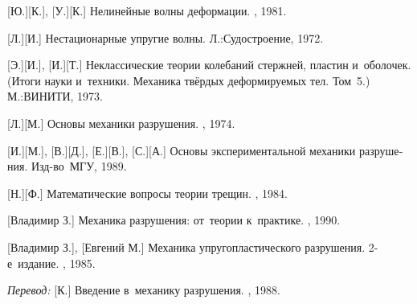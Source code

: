 \begin{thebibliography}{123}
\begin{otherlanguage}{russian}
[Ю.][К.], [У.][К.] Нелинейные волны деформации. \naukapublisher, 1981. 

[Л.][И.] Нестационарные упругие волны. Л.:\;Судостроение, 1972. 

[Э.][И.], [И.][Т.] Неклассические теории колебаний стержней, пластин и~оболочек. (Итоги науки и~техники. Механика твёрдых деформируемых тел. Том~5.) М.:\;ВИНИТИ, 1973. 

%
%



[Л.][М.]
Основы механики разрушения.
\naukapublisher, 1974.

[И.][М.],
[В.][Д.],
[Е.][В.],
[С.][А.]
Основы экспериментальной механики разрушения.
Изд\hbox{-}во~МГУ, 1989.

[Н.][Ф.]
Математические вопросы теории трещин.
\naukapublisher, 1984.

[Владимир З.]
Механика разрушения: от~теории к~практике.
\naukapublisher, 1990.

[Владимир З.], [Евгений М.]
Механика упругопластического разрушения.
2\hbox{-}е~издание. \naukapublisher, 1985.

\emph{Перевод:}
[К.]
Введение в~механику разрушения.
\mirpublisher, 1988.


\end{otherlanguage}
\end{thebibliography}
